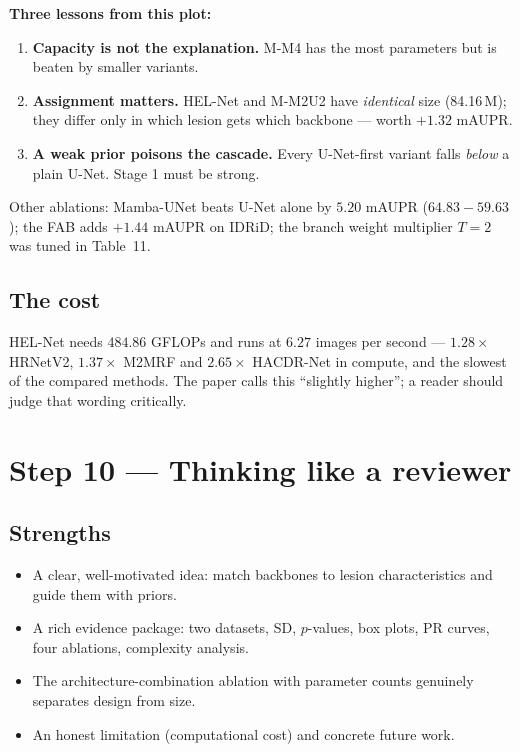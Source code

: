 \documentclass[11pt,a4paper]{article}
\begin{document}
\textbf{Three lessons from this plot:}
\begin{enumerate}
\item \textbf{Capacity is not the explanation.} M-M4 has the most parameters but is beaten by smaller
      variants.
\item \textbf{Assignment matters.} HEL-Net and M-M2U2 have \emph{identical} size (84.16\,M); they
      differ only in which lesion gets which backbone --- worth $+1.32$ mAUPR.
\item \textbf{A weak prior poisons the cascade.} Every U-Net-first variant falls \emph{below} a plain
      U-Net. Stage 1 must be strong.
\end{enumerate}
Other ablations: Mamba-UNet beats U-Net alone by $5.20$ mAUPR ($64.83-59.63$); the FAB adds
$+1.44$ mAUPR on IDRiD; the branch weight multiplier $T=2$ was tuned in Table~11.

\subsection*{The cost}
HEL-Net needs $484.86$ GFLOPs and runs at $6.27$ images per second --- $1.28\times$ HRNetV2,
$1.37\times$ M2MRF and $2.65\times$ HACDR-Net in compute, and the slowest of the compared methods.
The paper calls this ``slightly higher''; a reader should judge that wording critically.

\section{Step 10 --- Thinking like a reviewer}
\subsection{Strengths}
\begin{itemize}
\item A clear, well-motivated idea: match backbones to lesion characteristics and guide them with priors.
\item A rich evidence package: two datasets, SD, $p$-values, box plots, PR curves, four ablations,
      complexity analysis.
\item The architecture-combination ablation with parameter counts genuinely separates design from size.
\item An honest limitation (computational cost) and concrete future work.
\end{itemize}
\end{document}
